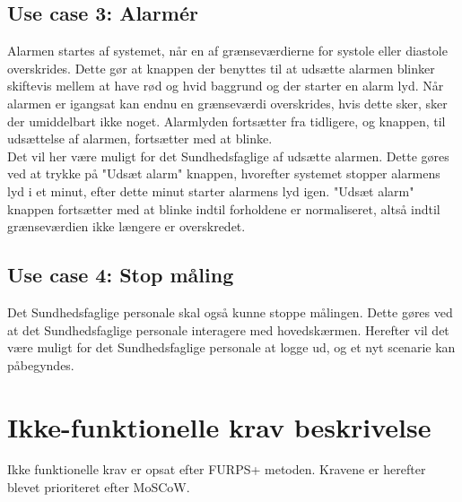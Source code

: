 \subsection{Use case 3: Alarmér}
Alarmen startes af systemet, når en af grænseværdierne for systole eller diastole overskrides. Dette gør at knappen der benyttes til at udsætte alarmen blinker skiftevis mellem at have rød og hvid baggrund og der starter en alarm lyd. Når alarmen er igangsat kan endnu en grænseværdi overskrides, hvis dette sker, sker der umiddelbart ikke noget. Alarmlyden fortsætter fra tidligere, og knappen, til udsættelse af alarmen, fortsætter med at blinke. \\
Det vil her være muligt for det Sundhedsfaglige af udsætte alarmen. Dette gøres ved at trykke på "Udsæt alarm" knappen, hvorefter systemet stopper alarmens lyd i et minut, efter dette minut starter alarmens lyd igen. "Udsæt alarm" knappen fortsætter med at blinke indtil forholdene er normaliseret, altså indtil grænseværdien ikke længere er overskredet.
\subsection{Use case 4: Stop måling}
Det Sundhedsfaglige personale skal også kunne stoppe målingen. Dette gøres ved at det Sundhedsfaglige personale interagere med hovedskærmen. Herefter vil det være muligt for det Sundhedsfaglige personale at logge ud, og et nyt scenarie kan påbegyndes.
\section{Ikke-funktionelle krav beskrivelse}
Ikke funktionelle krav er opsat efter FURPS+ metoden. Kravene er herefter blevet prioriteret efter MoSCoW.
